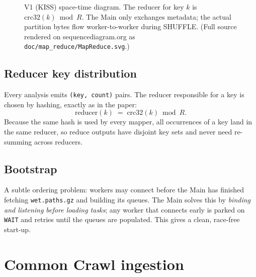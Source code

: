 \documentclass[11pt,a4paper]{article}
\newcommand{\code}[1]{\texttt{\small #1}}
\begin{document}
\begin{figure}[H]
\caption{V1 (KISS) space-time diagram. The reducer for key $k$ is
$\mathrm{crc32}(k)\bmod R$. The Main only exchanges metadata; the actual
partition bytes flow worker-to-worker during SHUFFLE. (Full source rendered on
sequencediagram.org as \code{doc/map\_reduce/MapReduce.svg}.)}
\label{fig:v1}
\end{figure}

\subsection{Reducer key distribution}

Every analysis emits \code{(key, count)} pairs. The reducer responsible for a
key is chosen by hashing, exactly as in the paper:
\[
\text{reducer}(k) \;=\; \mathrm{crc32}(k) \bmod R .
\]
Because the same hash is used by every mapper, all occurrences of a key land in
the same reducer, so reduce outputs have disjoint key sets and never need
re-summing across reducers.

\subsection{Bootstrap}

A subtle ordering problem: workers may connect before the Main has finished
fetching \code{wet.paths.gz} and building its queues. The Main solves this by
\emph{binding and listening before loading tasks}; any worker that connects
early is parked on \code{WAIT} and retries until the queues are populated. This
gives a clean, race-free start-up.

\section{Common Crawl ingestion}\label{sec:cc}
\end{document}
